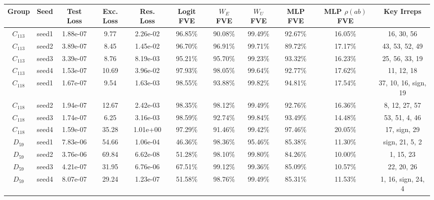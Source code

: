 \begin{tabular}{ccccccccccc}
\toprule
    Group &  Seed & Test Loss & Exc. Loss & Res. Loss & Logit FVE & $W_E$ FVE & $W_U$ FVE & MLP FVE & MLP $\rho(ab)$ FVE &                      Key Irreps \\
\midrule
$C_{113}$ & seed1 &  1.88e-07 &      9.77 &  2.26e-02 &   96.85\% &   90.08\% &   99.49\% & 92.67\% &            16.05\% &                      16, 30, 56 \\
$C_{113}$ & seed2 &  3.89e-07 &      8.45 &  1.45e-02 &   96.70\% &   96.91\% &   99.71\% & 89.72\% &            17.17\% &                  43, 53, 52, 49 \\
$C_{113}$ & seed3 &  3.39e-07 &      8.76 &  8.19e-03 &   95.21\% &   95.70\% &   99.23\% & 93.32\% &            16.23\% &                  25, 56, 33, 19 \\
$C_{113}$ & seed4 &  1.53e-07 &     10.69 &  3.96e-02 &   97.93\% &   98.05\% &   99.64\% & 92.77\% &            17.62\% &                      11, 12, 18 \\
$C_{118}$ & seed1 &  1.67e-07 &      9.54 &  1.63e-03 &   98.55\% &   93.88\% &   99.82\% & 94.81\% &            17.54\% &            37, 10, 16, sign, 19 \\
$C_{118}$ & seed2 &  1.94e-07 &     12.67 &  2.42e-03 &   98.35\% &   98.12\% &   99.49\% & 92.76\% &            16.36\% &                   8, 12, 27, 57 \\
$C_{118}$ & seed3 &  1.74e-07 &      6.25 &  3.16e-03 &   98.59\% &   92.74\% &   99.84\% & 93.49\% &            14.48\% &                   53, 51, 4, 46 \\
$C_{118}$ & seed4 &  1.59e-07 &     35.28 &  1.01e+00 &   97.29\% &   91.46\% &   99.42\% & 97.46\% &            20.05\% &                    17, sign, 29 \\
 $D_{59}$ & seed1 &  7.83e-06 &     54.66 &  1.06e-04 &   46.36\% &   98.36\% &   95.46\% & 85.38\% &            11.30\% &                  sign, 21, 5, 2 \\
 $D_{59}$ & seed2 &  3.76e-06 &     69.84 &  6.62e-08 &   51.28\% &   98.10\% &   99.80\% & 84.26\% &            10.00\% &                       1, 15, 23 \\
 $D_{59}$ & seed3 &  4.21e-07 &     31.95 &  6.76e-06 &   67.51\% &   99.12\% &   99.36\% & 85.09\% &            10.57\% &                      22, 20, 26 \\
 $D_{59}$ & seed4 &  8.07e-07 &     29.24 &  1.23e-07 &   51.58\% &   98.76\% &   99.49\% & 85.31\% &            11.53\% &              1, 16, sign, 24, 4 \\

\end{tabular}
